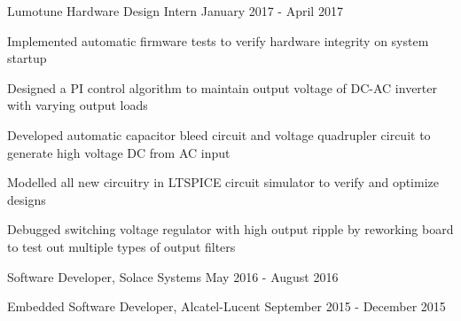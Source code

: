 \begin{cventries}
  \cventry
    {Lumotune} %
    {Hardware Design Intern} %
    {January 2017 - April 2017} %
    {}
    {
      \begin{cvitems} %
        \item {Implemented automatic firmware tests to verify hardware integrity on system startup}
        \item {Designed a PI control algorithm to maintain output voltage of DC-AC inverter with varying output loads}
        \item {Developed automatic capacitor bleed circuit and voltage quadrupler circuit to generate high voltage DC from AC input}
        \item {Modelled all new circuitry in LTSPICE circuit simulator to verify and optimize designs}
        \item {Debugged switching voltage regulator with high output ripple by reworking board to test out multiple types of output filters}
      \end{cvitems}
    }

  \cventryOneLine
    {Software Developer,} %
    {Solace Systems} %
    {May 2016 - August 2016} %

  \cventryOneLine
    {Embedded Software Developer,} %
    {Alcatel-Lucent} %
    {September 2015 - December 2015} %


\end{cventries}
